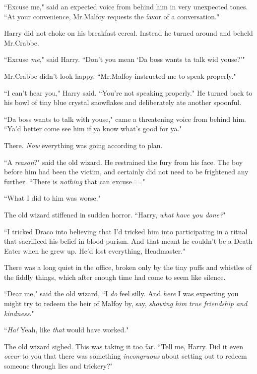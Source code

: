 ``Excuse me," said an expected voice from behind him in very unexpected tones. ``At your convenience, Mr.\?Malfoy requests the favor of a conversation."

Harry did not choke on his breakfast cereal. Instead he turned around and beheld Mr.\?Crabbe.

``Excuse \emph{me}," said Harry. ``Don't you mean `Da boss wants ta talk wid youse?'"

Mr.\?Crabbe didn't look happy. ``Mr.\?Malfoy instructed me to speak properly."

``I can't hear you," Harry said. ``You're not speaking properly." He turned back to his bowl of tiny blue crystal snowflakes and deliberately ate another spoonful.

``Da boss wants to talk with youse," came a threatening voice from behind him. ``Ya'd better come see him if ya know what's good for ya."

There. \emph{Now} everything was going according to plan.


``A \emph{reason}?" said the old wizard. He restrained the fury from his face. The boy before him had been the victim, and certainly did not need to be frightened any further. ``There is \emph{nothing} that can excuse\==="

``What I did to him was worse."

The old wizard stiffened in sudden horror. ``Harry, \emph{what have you done?}"

``I tricked Draco into believing that I'd tricked him into participating in a ritual that sacrificed his belief in blood purism. And that meant he couldn't be a Death Eater when he grew up. He'd lost everything, Headmaster."

There was a long quiet in the office, broken only by the tiny puffs and whistles of the fiddly things, which after enough time had come to seem like silence.

``Dear me," said the old wizard, ``I \emph{do} feel silly. And \emph{here} I was expecting you might try to redeem the heir of Malfoy by, say, \emph{showing him true friendship and kindness}."

``\emph{Ha!} Yeah, like \emph{that} would have worked."

The old wizard sighed. This was taking it too far. ``Tell me, Harry. Did it even \emph{occur} to you that there was something \emph{incongruous} about setting out to redeem someone through lies and trickery?"

